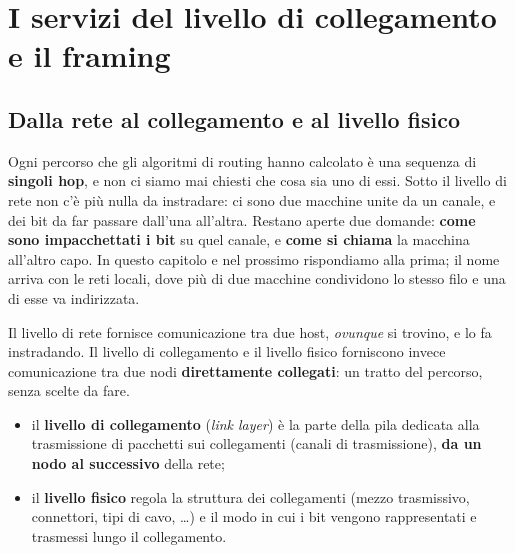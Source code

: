 \chapter{I servizi del livello di collegamento e il framing}

\begin{center}
\end{center}

\section{Dalla rete al collegamento e al livello fisico}

Ogni percorso che gli algoritmi di routing hanno calcolato è una sequenza di \textbf{singoli hop}, e non ci siamo mai chiesti che
cosa sia uno di essi. Sotto il livello di rete non c'è più nulla da instradare: ci sono due macchine unite da un canale, e dei bit
da far passare dall'una all'altra. Restano aperte due domande: \textbf{come sono impacchettati i bit} su quel canale, e \textbf{come
si chiama} la macchina all'altro capo. In questo capitolo e nel prossimo rispondiamo alla prima; il nome arriva con le reti locali,
dove più di due macchine condividono lo stesso filo e una di esse va indirizzata.

Il livello di rete fornisce comunicazione tra due host, \emph{ovunque} si trovino, e lo fa instradando. Il livello di
collegamento e il livello fisico forniscono invece comunicazione tra due nodi \textbf{direttamente collegati}: un tratto del
percorso, senza scelte da fare.

\begin{itemize}
    \item il \textbf{livello di collegamento} (\emph{link layer}) è la parte della pila dedicata alla trasmissione di pacchetti sui
          collegamenti (canali di trasmissione), \textbf{da un nodo al successivo} della rete;
    \item il \textbf{livello fisico} regola la struttura dei collegamenti (mezzo trasmissivo, connettori, tipi di cavo, \dots) e il modo
          in cui i bit vengono rappresentati e trasmessi lungo il collegamento.
\end{itemize}

